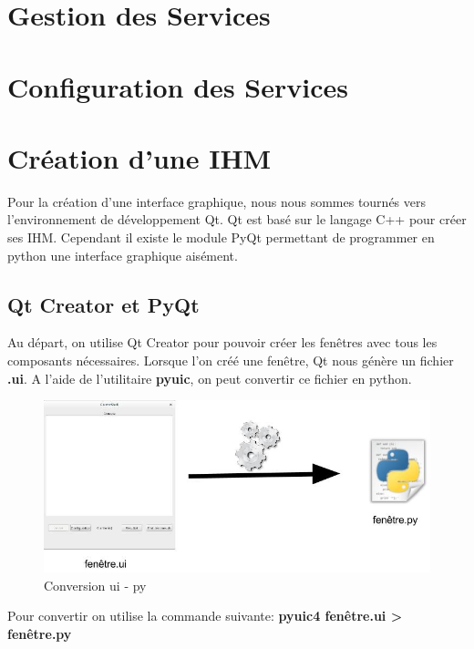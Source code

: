 \documentclass[a4paper,11pt]{article}
\begin{document}
\section{Gestion des Services}
\label{sec:section2}

\section{Configuration des Services}
\label{sec:section3}

\section{Création d'une IHM}
\label{sec:section4}
Pour la création d'une interface graphique, nous nous sommes tournés vers l'environnement de développement Qt. Qt est basé sur le langage C++ pour créer ses IHM. Cependant il existe le module PyQt permettant de programmer en python une interface graphique aisément.
\subsection{Qt Creator et PyQt}
Au départ, on utilise Qt Creator pour pouvoir créer les fenêtres avec tous les composants nécessaires. Lorsque l'on créé une fenêtre, Qt nous génère un fichier \textbf{.ui}. A l'aide de l'utilitaire \textbf{pyuic}, on peut convertir ce fichier en python. 
\begin{figure}[hbtp]
\centering
\includegraphics[scale=0.3]{conversion_ui_py.jpg}
\caption{Conversion ui - py}
\end{figure}

Pour convertir on utilise la commande suivante: \textbf{pyuic4 fenêtre.ui > fenêtre.py}
\end{document}
